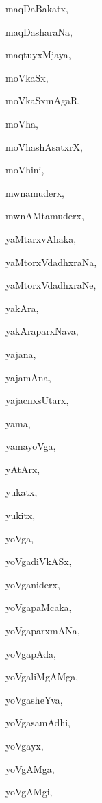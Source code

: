 \begin{multicols}{2}
{maqDaBakatx}, \pageref{maqDaBakatx}

{maqDasharaNa}, \pageref{maqDasharaNa}

{maqtuyxMjaya}, \pageref{maqtuyxMjaya}

{moVkaSx}, \pageref{moVkaSx}

{moVkaSxmAgaR}, \pageref{moVkaSxmAgaR}

{moVha}, \pageref{moVha}

{moVhashAsatxrX}, \pageref{moVhashAsatxrX}

{moVhini}, \pageref{moVhini}

{mwnamuderx}, \pageref{mwnamuderx}

{mwnAMtamuderx}, \pageref{mwnAMtamuderx}

{yaMtarxvAhaka}, \pageref{yaMtarxvAhaka}

{yaMtorxVdadhxraNa}, \pageref{yaMtorxVdadhxraNa}

{yaMtorxVdadhxraNe}, \pageref{yaMtorxVdadhxraNe}

{yakAra}, \pageref{yakAra}

{yakAraparxNava}, \pageref{yakAraparxNava}

{yajana}, \pageref{yajana}

{yajamAna}, \pageref{yajamAna}

{yajacnxsUtarx}, \pageref{yajacnxsUtarx}

{yama}, \pageref{yama}

{yamayoVga}, \pageref{yamayoVga}

{yAtArx}, \pageref{yAtArx}

{yukatx}, \pageref{yukatx}

{yukitx}, \pageref{yukitx}

{yoVga}, \pageref{yoVga}

{yoVgadiVkASx}, \pageref{yoVgadiVkASx}

{yoVganiderx}, \pageref{yoVganiderx}

{yoVgapaMcaka}, \pageref{yoVgapaMcaka}

{yoVgaparxmANa}, \pageref{yoVgaparxmANa}

{yoVgapAda}, \pageref{yoVgapAda}

{yoVgaliMgAMga}, \pageref{yoVgaliMgAMga}

{yoVgasheYva}, \pageref{yoVgasheYva}

{yoVgasamAdhi}, \pageref{yoVgasamAdhi}

{yoVgayx}, \pageref{yoVgayx}

{yoVgAMga}, \pageref{yoVgAMga}

{yoVgAMgi}, \pageref{yoVgAMgi}


\end{multicols}
